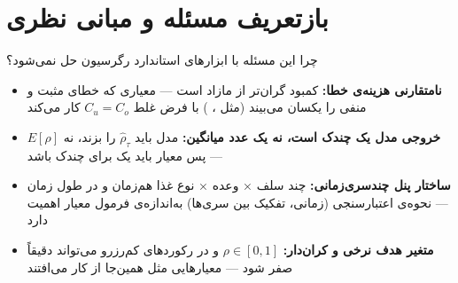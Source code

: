 \section{بازتعریف مسئله و مبانی نظری}

\begin{frame}{چرا این مسئله با ابزارهای استاندارد رگرسیون حل نمی‌شود؟}
  \begin{itemize}
    \item \textbf{نامتقارنی هزینه‌ی خطا:} کمبود گران‌تر از مازاد است — معیاری که خطای مثبت و
      منفی را یکسان می‌بیند (مثل ، ) با فرض غلط $C_u=C_o$ کار می‌کند
    \item \textbf{خروجی مدل یک چندک است، نه یک عدد میانگین:} مدل باید $\hat\rho_\tau$ را بزند،
      نه $E[\rho]$ — پس معیار باید یک  برای چندک باشد
    \item \textbf{ساختار پنل چندسری‌زمانی:} چند سلف × وعده × نوع غذا هم‌زمان و در طول زمان —
      نحوه‌ی اعتبارسنجی (زمانی، تفکیک بین سری‌ها) به‌اندازه‌ی فرمول معیار اهمیت دارد
    \item \textbf{متغیر هدف نرخی و کران‌دار:} $\rho\in[0,1]$ و در رکوردهای کم‌رزرو می‌تواند
      دقیقاً صفر شود — معیارهایی مثل  همین‌جا از کار می‌افتند
  \end{itemize}
\end{frame}

